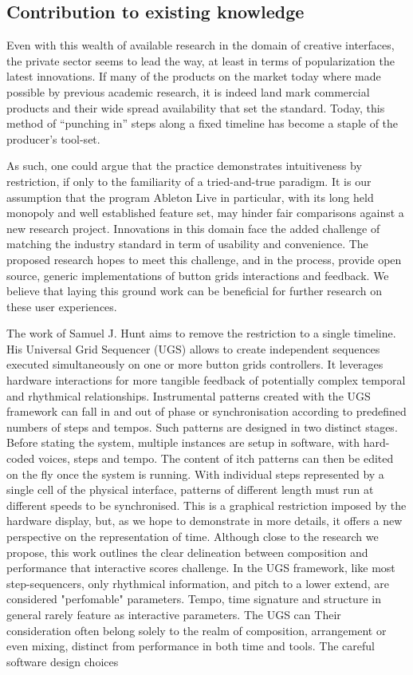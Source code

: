 \documentclass[journal,onecolumn]{IEEEtran}
\begin{document}
\subsection{Contribution to existing knowledge}
Even with this wealth of available research in the domain of creative interfaces, the private sector seems to lead the way, at least in terms of popularization the latest innovations. If many of the products on the market today where made possible by previous academic research, it is indeed land mark commercial products and their wide spread availability that set the standard. Today, this method of ``punching in'' steps along a fixed timeline has become a staple of the producer's tool-set.

As such, one could argue that the practice demonstrates intuitiveness by restriction, if only to the familiarity of a tried-and-true paradigm. It is our assumption that the program Ableton Live in particular, with its long held monopoly and well established feature set, may hinder fair comparisons against a new research project. Innovations in this domain face the added challenge of matching the industry standard in term of usability and convenience. The proposed research hopes to meet this challenge, and in the process, provide open source, generic implementations of button grids interactions and feedback. We believe that laying this ground work can be beneficial for further research on these user experiences. 

The work of Samuel J. Hunt\cite{hunt:poly} aims to remove the restriction to a single timeline. His Universal Grid Sequencer (UGS) allows to create independent sequences executed simultaneously on one or more button grids controllers. It leverages hardware interactions for more tangible feedback of potentially complex temporal and rhythmical relationships. Instrumental patterns created with the UGS framework can fall in and out of phase or synchronisation according to predefined numbers of steps and tempos. Such patterns are designed in two distinct stages. Before stating the system, multiple instances are setup in software, with hard-coded voices, steps and tempo. The content of itch patterns can then be edited on the fly once the system is running. With individual steps represented by a single cell of the physical interface, patterns of different length must run at different speeds to be synchronised. This is a graphical restriction imposed by the hardware display, but, as we hope to demonstrate in more details, it offers a new perspective on the representation of time. Although close to the research we propose, this work outlines the clear delineation between composition and performance that interactive scores challenge. In the UGS framework, like most step-sequencers, only rhythmical information, and pitch to a lower extend, are considered "perfomable" parameters. Tempo, time signature and structure in general rarely feature as interactive parameters. The UGS can Their consideration often belong solely to the realm of composition, arrangement or even mixing, distinct from performance in both time and tools.
The careful software design choices \\
\end{document}

